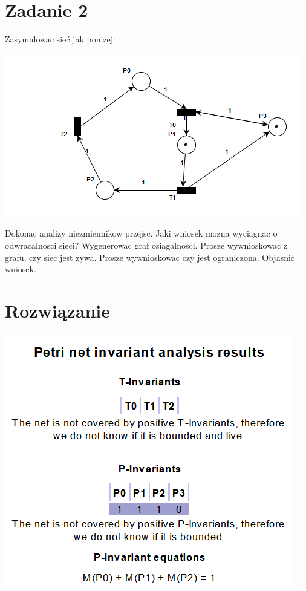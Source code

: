 \documentclass[12pt]{article}
\begin{document}
\section{Zadanie 2}
Zasymulowac sieć jak ponizej:
\begin{center}
\centering
    \includegraphics[scale=0.8]{zad2.png}
\end{center}
Dokonac analizy niezmiennikow przejsc. Jaki wniosek mozna wyciagnac o odwracalnosci sieci? Wygenerowac graf osiagalnosci. Prosze wywnioskowac z grafu, czy siec jest zywa. Prosze wywnioskowac czy jest ograniczona. Objasnic wniosek.

\section{Rozwiązanie}
\begin{center}
\centering
    \includegraphics{zad2_invariant.png}
\end{center}
\end{document}
